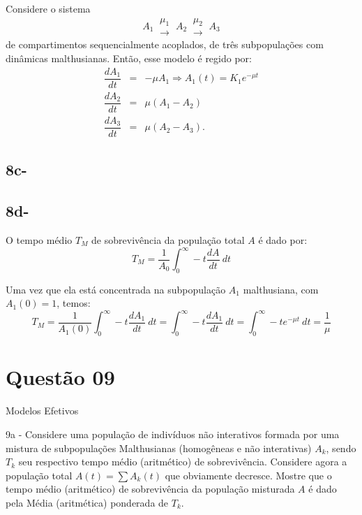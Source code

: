 {Considere o sistema 
\[
A_1 \ \substack{\mu_1 \\ \longrightarrow} \
A_2 \ \substack{\mu_2 \\ \longrightarrow} \
A_3
\]
de compartimentos sequencialmente acoplados, de três subpopulações com dinâmicas malthusianas. Então, esse modelo é regido por:
\[\begin{array}{rcl}
\dfrac{dA_{1}}{dt} &=& -\mu A_{1} \Rightarrow A_1(t) = K_1 e^{-\mu t} \\[0.3cm]
\dfrac{dA_{2}}{dt} &=& \mu(A_1 - A_{2}) \\[0.3cm]
\dfrac{dA_{3}}{dt} &=& \mu(A_2 - A_{3}).
\end{array}\]


\subsection*{8c-}

\subsection*{8d-}


O tempo médio \(T_M\) de sobrevivência da população total \(A\) é dado por:
\[
T_M
= \dfrac{1}{A_0} \displaystyle\int_{0}^{\infty} -t \dfrac{dA}{dt}\ dt
\]

Uma vez que ela está concentrada na subpopulação \(A_1\) malthusiana, com \(A_1(0) = 1\), temos:
\[
T_M
= \dfrac{1}{A_1(0)} \displaystyle\int_{0}^{\infty} -t \dfrac{dA_1}{dt}\ dt
= \displaystyle\int_{0}^{\infty} -t \dfrac{dA_1}{dt}\ dt
= \displaystyle\int_{0}^{\infty} -t e^{-\mu t}\ dt
= \dfrac{1}{\mu}
\]

}



\section*{Questão 09}


Modelos Efetivos

    9a - Considere uma população de indivíduos não interativos formada por uma mistura de subpopulações Malthusianas (homogêneas e não interativas) \(A_k\), sendo \(T_k\) seu respectivo tempo médio (aritmético) de sobrevivência. Considere agora a população total \(A(t) = \displaystyle \sum A_k(t)\) que obviamente decresce. Mostre que o tempo médio (aritmético) de sobrevivência da população misturada \(A\) é dado pela Média (aritmética) ponderada de \(T_k\).

